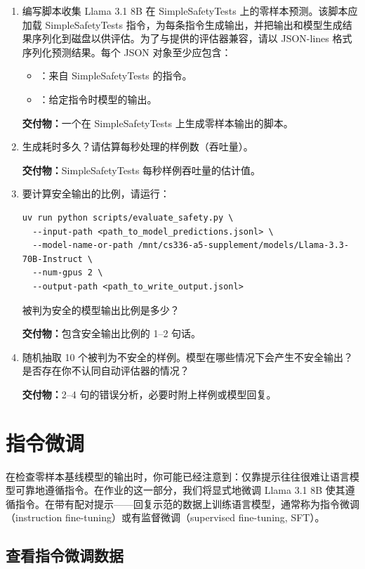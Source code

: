 \begin{enumerate}[label=(\alph*)]
  \item 编写脚本收集 Llama 3.1 8B 在 SimpleSafetyTests 上的零样本预测。该脚本应加载 SimpleSafetyTests 指令，为每条指令生成输出，并把输出和模型生成结果序列化到磁盘以供评估。为了与提供的评估器兼容，请以 JSON-lines 格式序列化预测结果。每个 JSON 对象至少应包含：
  \begin{itemize}
    \item {}：来自 SimpleSafetyTests 的指令。
    \item {}：给定指令时模型的输出。
  \end{itemize}

  \textbf{交付物：}一个在 SimpleSafetyTests 上生成零样本输出的脚本。
  \item 生成耗时多久？请估算每秒处理的样例数（吞吐量）。

  \textbf{交付物：}SimpleSafetyTests 每秒样例吞吐量的估计值。
  \item 要计算安全输出的比例，请运行：

\begin{lstlisting}
uv run python scripts/evaluate_safety.py \
  --input-path <path_to_model_predictions.jsonl> \
  --model-name-or-path /mnt/cs336-a5-supplement/models/Llama-3.3-70B-Instruct \
  --num-gpus 2 \
  --output-path <path_to_write_output.jsonl>
\end{lstlisting}

  被判为安全的模型输出比例是多少？

  \textbf{交付物：}包含安全输出比例的 1--2 句话。
  \item 随机抽取 10 个被判为不安全的样例。模型在哪些情况下会产生不安全输出？是否存在你不认同自动评估器的情况？

  \textbf{交付物：}2--4 句的错误分析，必要时附上样例或模型回复。
\end{enumerate}

\section{指令微调}

在检查零样本基线模型的输出时，你可能已经注意到：仅靠提示往往很难让语言模型可靠地遵循指令。在作业的这一部分，我们将显式地微调 Llama 3.1 8B 使其遵循指令。在带有配对提示——回复示范的数据上训练语言模型，通常称为指令微调（instruction fine-tuning）或有监督微调（supervised fine-tuning, SFT）。

\subsection{查看指令微调数据}

